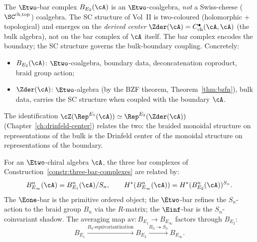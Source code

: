 \begin{remark}
\label{rem:e2-bar-not-sc}
The $\Etwo$-bar complex $B_{E_2}(\cA)$ is an $\Etwo$-coalgebra, \emph{not}
a Swiss-cheese ($\SC^{\mathrm{ch,top}}$) coalgebra. The SC structure of
Vol~II is two-coloured (holomorphic + topological) and emerges on the
\emph{derived center} $\Zder(\cA) = C^\bullet_{\mathrm{ch}}(\cA, \cA)$
(the bulk algebra), not on the bar complex of $\cA$ itself. The bar
complex encodes the boundary; the SC structure governs the bulk-boundary
coupling. Concretely:
\begin{itemize}
 \item $B_{E_2}(\cA)$: $\Etwo$-coalgebra, boundary data,
 deconcatenation coproduct, braid group action;
 \item $\Zder(\cA)$: $\Etwo$-algebra (by the BZF theorem,
 Theorem~\ref{thm:bzfn}), bulk data, carries the SC structure
 when coupled with the boundary $\cA$.
\end{itemize}
The identification $\cZ(\Rep^{E_1}(\cA)) \simeq \Rep^{E_2}(\Zder(\cA))$
(Chapter~\ref{ch:drinfeld-center}) relates the two: the braided monoidal
structure on representations of the bulk is the Drinfeld center of the
monoidal structure on representations of the boundary.
\end{remark}

\begin{proposition}
\label{prop:three-bars-relation}
For an $\Etwo$-chiral algebra $\cA$, the three bar complexes of
Construction~\ref{constr:three-bar-complexes} are related by:
\[
 B_{E_\infty}^n(\cA) = B_{E_1}^n(\cA) / S_n, \qquad
 H^*(B_{E_\infty}^n(\cA)) = H^*(B_{E_2}^n(\cA))^{S_n}.
\]
The $\Eone$-bar is the primitive ordered object; the $\Etwo$-bar
refines the $S_n$-action to the braid group $B_n$ via the $R$-matrix;
the $\Einf$-bar is the $S_n$-coinvariant shadow. The averaging map
$\mathrm{av} \colon B_{E_1} \to B_{E_\infty}$ factors through $B_{E_2}$:
\[
 B_{E_1} \xrightarrow{B_n\text{-equivariantization}} B_{E_2}
 \xrightarrow{B_n \twoheadrightarrow S_n} B_{E_\infty}.
\]
\end{proposition}

